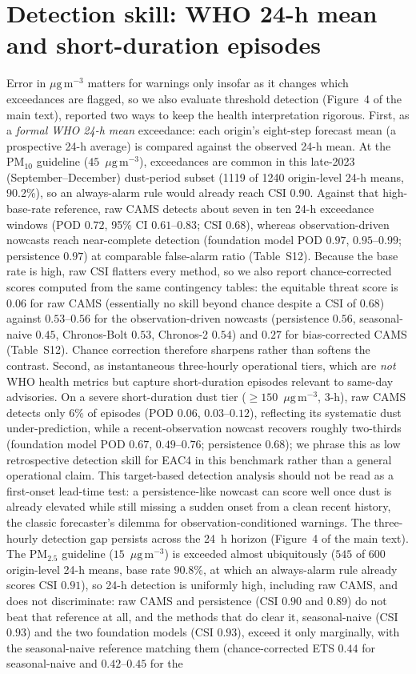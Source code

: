 \documentclass[11pt]{article}
\newcommand*{\ugm}{\ensuremath{\mu\mathrm{g\,m^{-3}}}}
\newcommand*{\pmtf}{\ensuremath{\mathrm{PM_{2.5}}}}
\newcommand*{\pmten}{\ensuremath{\mathrm{PM_{10}}}}
\begin{document}
\section{Detection skill: WHO 24-h mean and short-duration episodes}
Error in \ugm{} matters for warnings only insofar as it changes which exceedances are flagged, so we also evaluate threshold detection (Figure~4 of the main text), reported two ways to keep the health interpretation rigorous. First, as a \emph{formal WHO 24-h mean} exceedance: each origin's eight-step forecast mean (a prospective 24-h average) is compared against the observed 24-h mean. At the \pmten{} guideline ($45$~\ugm), exceedances are common in this late-2023 (September--December) dust-period subset (1119 of 1240 origin-level 24-h means, 90.2\%), so an always-alarm rule would already reach CSI 0.90. Against that high-base-rate reference, raw CAMS detects about seven in ten 24-h exceedance windows (POD $0.72$, 95\% CI $0.61$--$0.83$; CSI $0.68$), whereas observation-driven nowcasts reach near-complete detection (foundation model POD $0.97$, $0.95$--$0.99$; persistence $0.97$) at comparable false-alarm ratio (Table~S12). Because the base rate is high, raw CSI flatters every method, so we also report chance-corrected scores computed from the same contingency tables: the equitable threat score is $0.06$ for raw CAMS (essentially no skill beyond chance despite a CSI of $0.68$) against $0.53$--$0.56$ for the observation-driven nowcasts (persistence $0.56$, seasonal-naive $0.45$, Chronos-Bolt $0.53$, Chronos-2 $0.54$) and $0.27$ for bias-corrected CAMS (Table~S12). Chance correction therefore sharpens rather than softens the contrast. Second, as instantaneous three-hourly operational tiers, which are \emph{not} WHO health metrics but capture short-duration episodes relevant to same-day advisories. On a severe short-duration dust tier ($\geq150$~\ugm, 3-h), raw CAMS detects only $6\%$ of episodes (POD $0.06$, $0.03$--$0.12$), reflecting its systematic dust under-prediction, while a recent-observation nowcast recovers roughly two-thirds (foundation model POD $0.67$, $0.49$--$0.76$; persistence $0.68$); we phrase this as low retrospective detection skill for EAC4 in this benchmark rather than a general operational claim. This target-based detection analysis should not be read as a first-onset lead-time test: a persistence-like nowcast can score well once dust is already elevated while still missing a sudden onset from a clean recent history, the classic forecaster's dilemma for observation-conditioned warnings. The three-hourly detection gap persists across the 24~h horizon (Figure~4 of the main text). The \pmtf{} guideline ($15$~\ugm) is exceeded almost ubiquitously ($545$ of $600$ origin-level 24-h means, base rate $90.8\%$, at which an always-alarm rule already scores CSI $0.91$), so 24-h detection is uniformly high, including raw CAMS, and does not discriminate: raw CAMS and persistence (CSI $0.90$ and $0.89$) do not beat that reference at all, and the methods that do clear it, seasonal-naive (CSI $0.93$) and the two foundation models (CSI $0.93$), exceed it only marginally, with the seasonal-naive reference matching them (chance-corrected ETS $0.44$ for seasonal-naive and $0.42$--$0.45$ for the 
\end{document}
